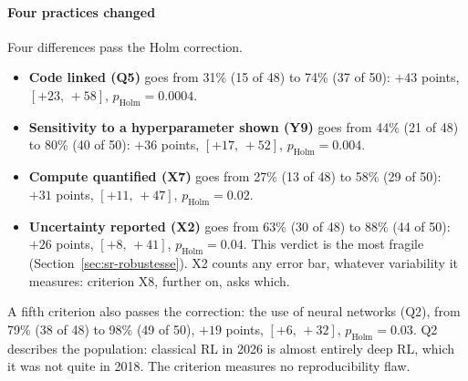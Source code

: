 


\paragraph{Four practices changed}
Four differences pass the Holm correction.
\begin{itemize}
  \item \textbf{Code linked (Q5)} goes from 31\% (15 of 48) to 74\% (37 of 50): $+43$ points,
  $[+23,\,+58]$, $p_{\text{Holm}} = 0.0004$.
  \item \textbf{Sensitivity to a hyperparameter shown (Y9)} goes from 44\% (21 of 48) to 80\% (40 of
  50): $+36$ points, $[+17,\,+52]$, $p_{\text{Holm}} = 0.004$.
  \item \textbf{Compute quantified (X7)} goes from 27\% (13 of 48) to 58\% (29 of 50): $+31$ points,
  $[+11,\,+47]$, $p_{\text{Holm}} = 0.02$.
  \item \textbf{Uncertainty reported (X2)} goes from 63\% (30 of 48) to 88\% (44 of 50): $+26$ points,
  $[+8,\,+41]$, $p_{\text{Holm}} = 0.04$. This verdict is the most fragile
  (Section~\ref{sec:sr-robustesse}). X2 counts any error bar, whatever variability it measures: criterion
  X8, further on, asks which.
\end{itemize}
A fifth criterion also passes the correction: the use of neural networks (Q2), from 79\% (38 of 48) to
98\% (49 of 50), $+19$ points, $[+6,\,+32]$, $p_{\text{Holm}} = 0.03$. Q2 describes the population:
classical RL in 2026 is almost entirely deep RL, which it was not quite in 2018. The criterion measures
no reproducibility flaw.

